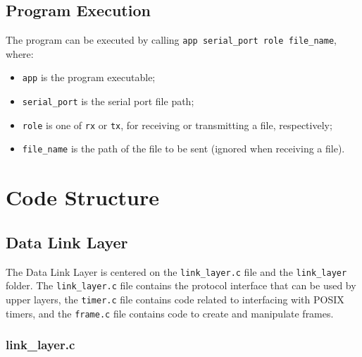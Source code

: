 \documentclass[11pt,a4paper,twocolumn]{article}
\begin{document}
\subsection{Program Execution}

The program can be executed by calling \lstinline{app serial_port role file_name}, where:

\begin{itemize}
    \item \lstinline{app} is the program executable;
    \item \lstinline{serial_port} is the serial port file path;
    \item \lstinline{role} is one of \lstinline{rx} or \lstinline{tx}, for receiving or transmitting a file, respectively;
    \item \lstinline{file_name} is the path of the file to be sent (ignored when receiving a file).
\end{itemize}

\section{Code Structure}

\subsection{Data Link Layer}
\label{sec:dll}

The Data Link Layer is centered on the \lstinline{link_layer.c} file and the \lstinline{link_layer} folder.
The \lstinline{link_layer.c} file contains the protocol interface that can be used by upper layers, the \lstinline{timer.c} file contains code related to interfacing with POSIX timers, and the \lstinline{frame.c} file contains code to create and manipulate frames.

\subsubsection{link\_layer.c}
\end{document}
